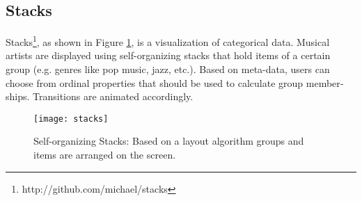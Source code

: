 \begin{english}
\subsection{Stacks}

Stacks\footnote{http://github.com/michael/stacks}, as shown in Figure \ref{fig:stacks}, is a visualization of categorical data. Musical artists are displayed using self-organizing stacks that hold items of a certain group (e.g. genres like pop music, jazz, etc.). Based on meta-data, users can choose from ordinal properties that should be used to calculate group memberships. Transitions are animated accordingly. 

\begin{figure}
\centering
\texttt{[image: stacks]}
\caption{Self-organizing Stacks: Based on a layout algorithm groups and items are arranged on the screen.}
\label{fig:stacks}
\end{figure}

\end{english}